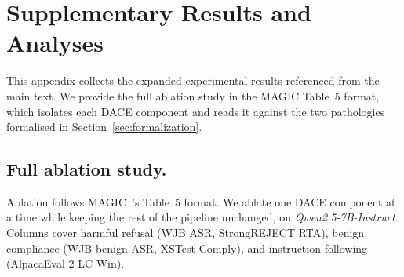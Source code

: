 \documentclass{article}
\newcommand{\method}{\textsc{DACE}\xspace}
\begin{document}
\section{Supplementary Results and Analyses}
\label{apdx:expanded-results}

This appendix collects the expanded experimental results referenced from the main text. We provide the full ablation study in the MAGIC Table~5 format, which isolates each \method component and reads it against the two pathologies formalised in Section~\ref{sec:formalization}.


\subsection{Full ablation study.}
\label{apdx:bench-ablation-full}

Ablation follows MAGIC~\citep{magic2025}'s Table~5 format. We ablate one \method component at a time while keeping the rest of the pipeline unchanged, on \textit{Qwen2.5-7B-Instruct}. Columns cover harmful refusal (WJB ASR, StrongREJECT RTA), benign compliance (WJB benign ASR, XSTest Comply), and instruction following (AlpacaEval 2 LC Win).
\end{document}
